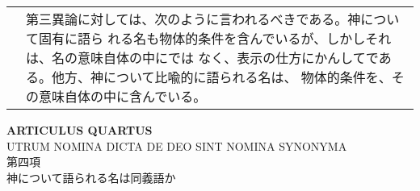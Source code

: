 \documentclass[10pt]{jsarticle}
\begin{document}
\begin{longtable}{p{21em}p{21em}}
&

第三異論に対しては、次のように言われるべきである。神について固有に語ら
れる名も物体的条件を含んでいるが、しかしそれは、名の意味自体の中にでは
なく、表示の仕方にかんしてである。他方、神について比喩的に語られる名は、
物体的条件を、その意味自体の中に含んでいる。

\\

\end{longtable}

%
%

\newpage
{}

\begin{center}
{\Large {\bf ARTICULUS QUARTUS}}\\
{\large UTRUM NOMINA DICTA DE DEO SINT NOMINA SYNONYMA\\
第四項\\
神について語られる名は同義語か}
\end{center}
\end{document}
